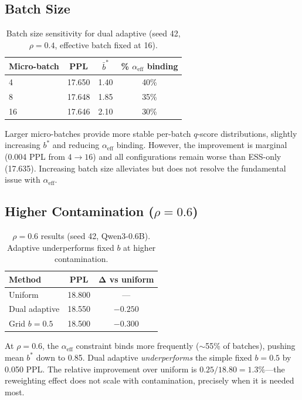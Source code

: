 \documentclass[11pt]{article}
\begin{document}
\subsection{Batch Size}

\begin{table}[h]
\centering
\caption{Batch size sensitivity for dual adaptive (seed 42, $\rho = 0.4$, effective batch fixed at 16).}
\label{tab:batchsize}
\begin{tabular}{lccc}
\toprule
\textbf{Micro-batch} & \textbf{PPL} & $\bar{b}^*$ & \textbf{\% $\alpha_{\mathrm{eff}}$ binding} \\
\midrule
4 & 17.650 & 1.40 & 40\% \\
8 & 17.648 & 1.85 & 35\% \\
16 & 17.646 & 2.10 & 30\% \\
\bottomrule
\end{tabular}
\end{table}

Larger micro-batches provide more stable per-batch $q$-score distributions, slightly increasing $b^*$ and reducing $\alpha_{\mathrm{eff}}$ binding. However, the improvement is marginal (0.004 PPL from $4 \to 16$) and all configurations remain worse than ESS-only (17.635). Increasing batch size alleviates but does not resolve the fundamental issue with $\alpha_{\mathrm{eff}}$.

\subsection{Higher Contamination ($\rho = 0.6$)}

\begin{table}[h]
\centering
\caption{$\rho = 0.6$ results (seed 42, Qwen3-0.6B). Adaptive underperforms fixed $b$ at higher contamination.}
\label{tab:rho06}
\begin{tabular}{lcc}
\toprule
\textbf{Method} & \textbf{PPL} & $\boldsymbol{\Delta}$ \textbf{vs uniform} \\
\midrule
Uniform & 18.800 & --- \\
Dual adaptive & 18.550 & $-0.250$ \\
Grid $b = 0.5$ & 18.500 & $-0.300$ \\
\bottomrule
\end{tabular}
\end{table}

At $\rho = 0.6$, the $\alpha_{\mathrm{eff}}$ constraint binds more frequently ($\sim$55\% of batches), pushing mean $b^*$ down to 0.85. Dual adaptive \emph{underperforms} the simple fixed $b = 0.5$ by 0.050 PPL. The relative improvement over uniform is $0.25/18.80 = 1.3\%$---the reweighting effect does not scale with contamination, precisely when it is needed most.
\end{document}
